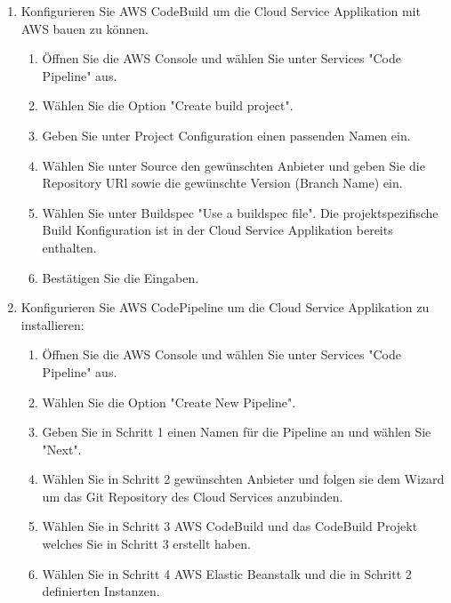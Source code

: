 \begin{enumerate}
\begin{enumerate}
        \item Folgen Sie der offiziellen Anleitung \footnote{https://docs.aws.amazon.com/elasticbeanstalk/latest/dg/environments-cfg-softwaresettings.html} um die nötigen Umgebungsvariablen zu setzen:
        \item Name: FCM\_CREDENTIALS, Wert: Firebase Credentials mit Base 64 Encoded\footnote{Siehe Installationsanleitung Firebase Messaging}
        \item Name: SPRING\_PROFILES\_ACTIVE, Wert: aws.
    \end{enumerate}
    \item Konfigurieren Sie AWS CodeBuild um die Cloud Service Applikation mit AWS bauen zu können.
    \begin{enumerate}
        \item Öffnen Sie die AWS Console und wählen Sie unter Services "Code Pipeline" aus.
        \item Wählen Sie die Option "Create build project".
        \item Geben Sie unter Project Configuration einen passenden Namen ein.
        \item Wählen Sie unter Source den gewünschten Anbieter und geben Sie die Repository URl sowie die gewünschte Version (Branch Name) ein.
        \item Wählen Sie unter Buildspec "Use a buildspec file". Die projektspezifische Build Konfiguration ist in der Cloud Service Applikation bereits enthalten.
        \item Bestätigen Sie die Eingaben.
    \end{enumerate}
    \item Konfigurieren Sie AWS CodePipeline um die Cloud Service Applikation zu installieren:
    \begin{enumerate}
        \item Öffnen Sie die AWS Console und wählen Sie unter Services "Code Pipeline" aus.
        \item Wählen Sie die Option "Create New Pipeline".
        \item Geben Sie in Schritt 1 einen Namen für die Pipeline an und wählen Sie "Next".
        \item Wählen Sie in Schritt 2 gewünschten Anbieter und folgen sie dem Wizard um das Git Repository des Cloud Services anzubinden.
        \item Wählen Sie in Schritt 3 AWS CodeBuild und das CodeBuild Projekt welches Sie in Schritt 3 erstellt haben.
        \item Wählen Sie in Schritt 4 AWS Elastic Beanstalk und die in Schritt 2 definierten Instanzen.

\end{enumerate}
\end{enumerate}
